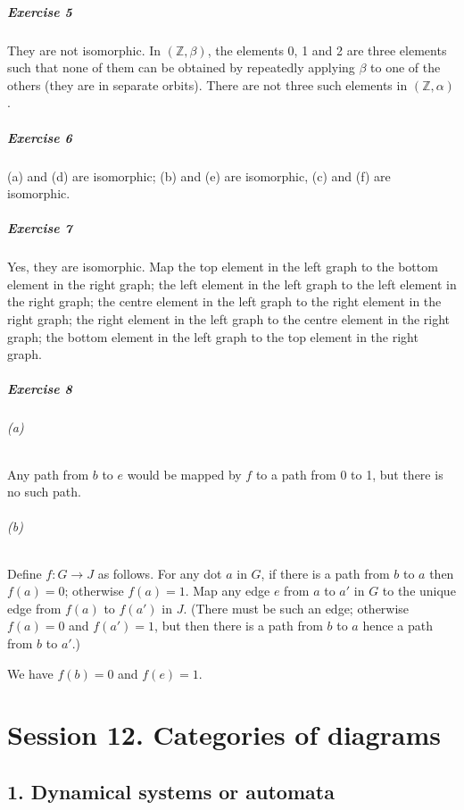 \documentclass{report}
\begin{document}
    \paragraph{Exercise 5}
    They are not isomorphic. In $(\mathbb{Z}, \beta)$, the elements 0, 1 and 2 are three elements such that
    none of them can be obtained by repeatedly applying $\beta$ to one of the others (they are in separate
    orbits). There are not three such elements in $(\mathbb{Z}, \alpha)$.

    \paragraph{Exercise 6}
    (a) and (d) are isomorphic; (b) and (e) are isomorphic, (c) and (f) are isomorphic.

    \paragraph{Exercise 7}
    Yes, they are isomorphic. Map the top element in the left graph to the bottom element in the right graph;
    the left element in the left graph to the left element in the right graph;
    the centre element in the left graph to the right element in the right graph;
    the right element in the left graph to the centre element in the right graph;
    the bottom element in the left graph to the top element in the right graph.

    \paragraph{Exercise 8}
    \subparagraph{(a)}
    Any path from $b$ to $e$ would be mapped by $f$ to a path from 0 to 1, but there is no such path.
    \subparagraph{(b)}
    Define $f : G \rightarrow J$ as follows. For any dot $a$ in $G$, if there is a path from $b$ to $a$
    then $f(a) = 0$; otherwise $f(a) = 1$. Map any edge $e$ from $a$ to $a'$ in $G$ to the unique edge
    from $f(a)$ to $f(a')$ in $J$. (There must be such an edge; otherwise $f(a) = 0$ and $f(a') = 1$,
    but then there is a path from $b$ to $a$ hence a path from $b$ to $a'$.)

    We have $f(b) = 0$ and $f(e) = 1$.

    \chapter{Session 12. Categories of diagrams}

    \section{1. Dynamical systems or automata}
\end{document}
